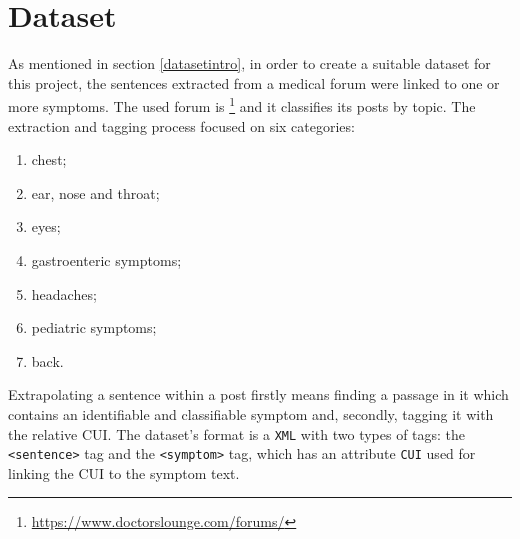 \newpage
\section{Dataset}
\label{sec:dataset}
As mentioned in section \ref{datasetintro}, in order to create a suitable dataset for this project, the sentences extracted from a medical forum were linked to one or more symptoms. The used forum is \footnote{\url{https://www.doctorslounge.com/forums/}} \cite{doctorslounge} and it classifies its posts by topic. The extraction and tagging process focused on six categories:
\begin{enumerate}
  \item chest;
  \item ear, nose and throat;
  \item eyes;
  \item gastroenteric symptoms;
  \item headaches;
  \item pediatric symptoms;
  \item back.
\end{enumerate}

Extrapolating a sentence within a post firstly means finding a passage in it which contains an identifiable and classifiable symptom and, secondly, tagging it with the relative CUI. The dataset's format is a \texttt{XML} with two types of tags: the \texttt{<sentence>} tag and the \texttt{<symptom>} tag, which has an attribute \texttt{CUI} used for linking the CUI to the symptom text.
